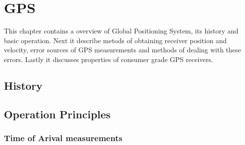 \chapter{GPS}
\label{chap:gps}

This chapter contains a overview of Global Positioning System,
its history and basic operation.
Next it describe metods of obtaining receiver position and velocity,
error sources of GPS measurements and methods of dealing with these errors.
Lastly it discusses properties of consumer grade GPS receivers.

%
%
%
\section{History}
%
\section{Operation Principles}
%
\subsection{Time of Arival measurements}

%
%
%
%
%
